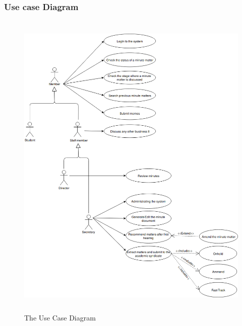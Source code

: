 \documentclass[a4paper,beamer]{article}
\begin{document}
	\egroup
	\newpage      
	
	\subsubsection{Use case Diagram}
	
	\begin{figure}[h]
		\begin{center}
			\includegraphics[width=6in,height=6in]{img/use-case-diagram}
		\end{center}
		\caption{The Use Case Diagram}
		\label{fig:usecase}
	\end{figure}
	\newpage        
	
\end{document}
